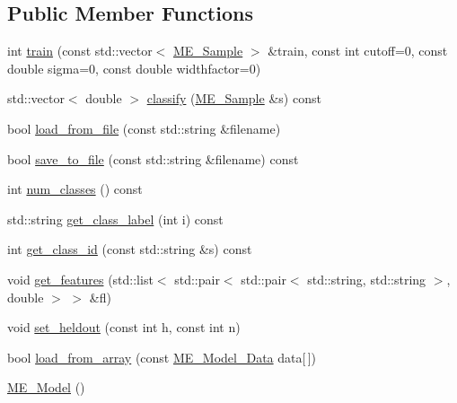\subsection*{Public Member Functions}
\begin{CompactItemize}
\item 
int \hyperlink{classME__Model_246ff3f37fbee3abf4bef0f978bd031e}{train} (const std::vector$<$ \hyperlink{structME__Sample}{ME\_\-Sample} $>$ \&train, const int cutoff=0, const double sigma=0, const double widthfactor=0)
\item 
std::vector$<$ double $>$ \hyperlink{classME__Model_28a77dc1738038d8a5a1350e157428c4}{classify} (\hyperlink{structME__Sample}{ME\_\-Sample} \&s) const 
\item 
bool \hyperlink{classME__Model_a1e19dc4d15bc1c0f4602a1bbd9174a4}{load\_\-from\_\-file} (const std::string \&filename)
\item 
bool \hyperlink{classME__Model_f87748d7eecfe434b3d8091e0bae51b5}{save\_\-to\_\-file} (const std::string \&filename) const 
\item 
int \hyperlink{classME__Model_eb9794bcc52f8a3a811ac81965ba49ce}{num\_\-classes} () const 
\item 
std::string \hyperlink{classME__Model_ab8a707a23f53cb60a0bb6eff0a602bd}{get\_\-class\_\-label} (int i) const 
\item 
int \hyperlink{classME__Model_1723d988619ce8b789de6181630f384a}{get\_\-class\_\-id} (const std::string \&s) const 
\item 
void \hyperlink{classME__Model_bd1372fb000a4fdc8ef9b560a0c8b4c3}{get\_\-features} (std::list$<$ std::pair$<$ std::pair$<$ std::string, std::string $>$, double $>$ $>$ \&fl)
\item 
void \hyperlink{classME__Model_3968368d934b31e0a541654f64513ad6}{set\_\-heldout} (const int h, const int n)
\item 
bool \hyperlink{classME__Model_9c920643190ccbec467e4e9cf916c4b8}{load\_\-from\_\-array} (const \hyperlink{structME__Model__Data}{ME\_\-Model\_\-Data} data\mbox{[}$\,$\mbox{]})
\item 
\hyperlink{classME__Model_8f611394be442ebd07ef20cb866e09ee}{ME\_\-Model} ()
\end{CompactItemize}
